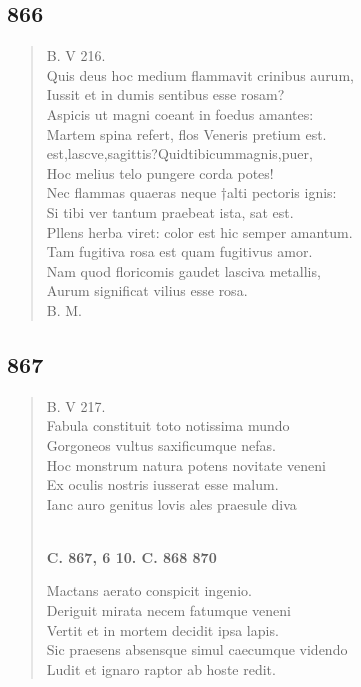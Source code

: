\documentclass[11pt, a4paper]{report}
\begin{document}
            \subsection*{866}
      \begin{verse}
      B. V 216. \\ Quis deus hoc medium flammavit crinibus aurum, \\ Iussit et in dumis sentibus esse rosam? \\ Aspicis ut magni coeant in foedus amantes: \\ Martem spina refert, flos Veneris pretium est. \\ est,lascve,sagittis?Quidtibicummagnis,puer, \\ Hoc melius telo pungere corda potes! \\ Nec flammas quaeras neque †alti pectoris ignis: \\ Si tibi ver tantum praebeat ista, sat est. \\ Pllens herba viret: color est hic semper amantum. \\ Tam fugitiva rosa est quam fugitivus amor. \\ Nam quod floricomis gaudet lasciva metallis, \\ Aurum significat vilius esse rosa. \\ B. M. \\ 
      \end{verse}
  
            \subsection*{867}
      \begin{verse}
      B. V 217. \\ Fabula constituit toto notissima mundo \\ Gorgoneos vultus saxificumque nefas. \\ Hoc monstrum natura potens novitate veneni \\ Ex oculis nostris iusserat esse malum. \\ Ianc auro genitus lovis ales praesule diva \\ 
        ﻿\pagebreak 
    \begin{center} \textbf{C. 867, 6 10. C. 868 870} \end{center} \marginpar{[317]} Mactans aerato conspicit ingenio. \\ Deriguit mirata necem fatumque veneni \\ Vertit et in mortem decidit ipsa lapis. \\ Sic praesens absensque simul caecumque videndo \\ Ludit et ignaro raptor ab hoste redit. \\ 
      \end{verse}
  
\end{document}
